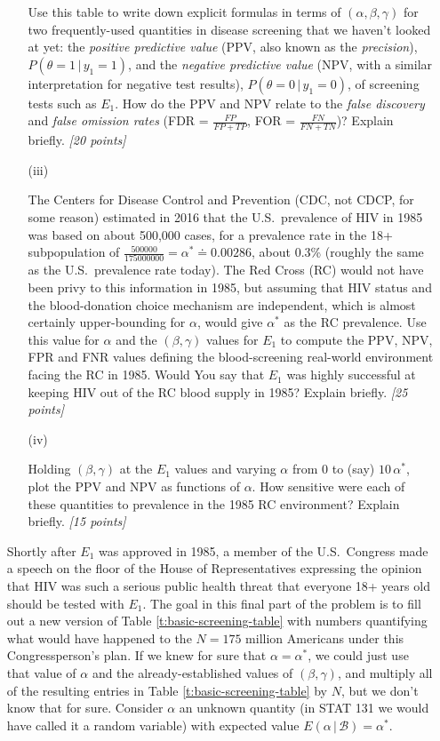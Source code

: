 \documentclass[12pt]{article}
\newcommand{\given}{\, | \,}
\newcommand{\given}{\, | \,}
\begin{document}
\begin{itemize}
\begin{itemize}
Use this table to write down explicit formulas in terms of $( \alpha, \beta, \gamma )$ for two frequently-used quantities in disease screening that we haven't looked at yet: the \textit{positive predictive value} (PPV, also known as the \textit{precision}), $P ( \theta = 1 \given y_1 = 1 )$, and the \textit{negative predictive value} (NPV, with a similar interpretation for negative test results), $P ( \theta = 0 \given y_1 = 0 )$, of screening tests such as $E_1$. How do the PPV and NPV relate to the \textit{false discovery} and \textit{false omission rates} (FDR = $\frac{ FP }{ FP + TP }$, FOR = $\frac{ FN }{ FN + TN }$)? Explain briefly. \textit{[20 points]}

\item[(iii)]

The Centers for Disease Control and Prevention (CDC, not CDCP, for some reason) estimated in 2016 that the U.S.~prevalence of HIV in 1985 was based on about 500,000 cases, for a prevalence rate in the 18+ subpopulation of $\frac{ 500000 }{ 175000000 } = \alpha^* \doteq 0.00286$, about 0.3\% (roughly the same as the U.S.~prevalence rate today). The Red Cross (RC) would not have been privy to this information in 1985, but assuming that HIV status and the blood-donation choice mechanism are independent, which is almost certainly upper-bounding for $\alpha$, would give $\alpha^*$ as the RC prevalence. Use this value for $\alpha$ and the $( \beta, \gamma )$ values for $E_1$ to compute the PPV, NPV, FPR and FNR values defining the blood-screening real-world environment facing the RC in 1985. Would You say that $E_1$ was highly successful at keeping HIV out of the RC blood supply in 1985? Explain briefly. \textit{[25 points]}

\item[(iv)]

Holding $( \beta, \gamma )$ at the $E_1$ values and varying $\alpha$ from 0 to (say) $10 \, \alpha^*$, plot the PPV and NPV as functions of $\alpha$. How sensitive were each of these quantities to prevalence in the 1985 RC environment? Explain briefly. \textit{[15 points]}

\end{itemize}

Shortly after $E_1$ was approved in 1985, a member of the U.S.~Congress made a speech on the floor of the House of Representatives expressing the opinion that HIV was such a serious public health threat that everyone 18+ years old should be tested with $E_1$. The goal in this final part of the problem is to fill out a new version of Table \ref{t:basic-screening-table} with numbers quantifying what would have happened to the $N = 175$ million Americans under this Congressperson's plan. If we knew for sure that $\alpha = \alpha^*$, we could just use that value of $\alpha$ and the already-established values of $( \beta, \gamma )$, and multiply all of the resulting entries in Table \ref{t:basic-screening-table} by $N$, but we don't know that for sure. Consider $\alpha$ an unknown quantity (in STAT 131 we would have called it a random variable) with expected value $E ( \alpha \given \mathcal{ B } ) = \alpha^*$. 


\end{itemize}
\end{document}
